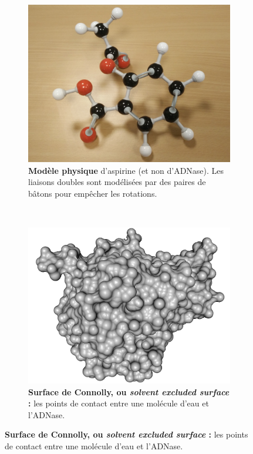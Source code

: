 \begin{figure}[!htbp]
\begin{subfigure}[t]{\subImgW}
			\centering
			\includegraphics[width=\textwidth]{./figures/ch1/aspirin}
			\caption[Modèle physique de l'aspirine]{\textbf{Modèle physique }d'aspirine (et non d'ADNase). Les liaisons doubles sont modélisées par des paires de bâtons pour empêcher les rotations.}
			\label{fig:aspirin}
		\end{subfigure}
		~
		\begin{subfigure}[t]{\subImgW}
			\centering
			\includegraphics[width=\textwidth]{./figures/ch1/4awn_ses}
			\caption[Représentation en surface de Connolly]{\textbf{Surface de Connolly, ou \emph{solvent excluded surface} :} les points de contact entre une molécule d'eau et l'ADNase.}
			\label{fig:4awn_ses}

\end{subfigure}
\end{figure}
